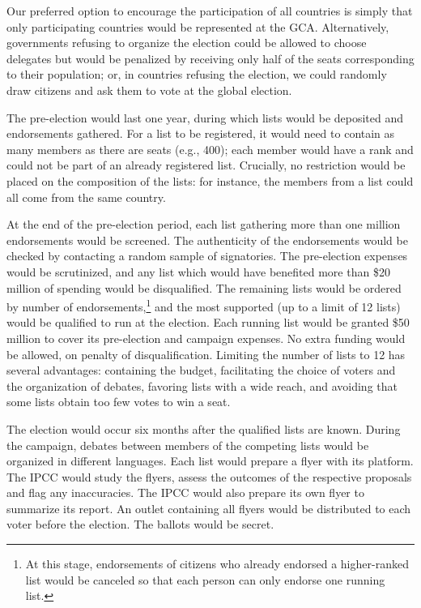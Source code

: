 \documentclass[12pt,english]{article}
\begin{document}
Our preferred option to encourage the participation of all countries is simply that only participating countries would be represented at the GCA. Alternatively,  governments refusing to organize the election could be allowed to choose delegates but would be penalized by receiving only half of the seats corresponding to their population; or, in countries refusing the election, we could randomly draw citizens and ask them to vote at the global election. 

The pre-election would last one year, during which lists would be deposited and endorsements gathered. For a list to be registered, it would need to contain as many members as there are seats (e.g., 400); each member would have a rank and could not be part of an already registered list. Crucially, no restriction would be placed on the composition of the lists: for instance, the members from a list could all come from the same country. %

At the end of the pre-election period, each list gathering more than one million endorsements would be screened. The authenticity of the endorsements would be checked by contacting a random sample of signatories. The pre-election expenses would be scrutinized, and any list which would have benefited more than \$20 million of spending would be disqualified. The remaining lists would be ordered by number of endorsements,\footnote{At this stage, endorsements of citizens who already endorsed a higher-ranked list would be canceled so that each person can only endorse one running list.
} and the most supported (up to a limit of 12 lists) would be qualified to run at the election. Each running list would be granted \$50 million to cover its pre-election and campaign expenses. No extra funding would be allowed, on penalty of disqualification. Limiting the number of lists to 12 has several advantages: containing the budget, facilitating the choice of voters and the organization of debates, favoring lists with a wide reach, and avoiding that some lists obtain too few votes to win a seat. 

The election would occur six months after the qualified lists are known. During the campaign, debates between members of the competing lists would be organized in different languages. Each list would prepare a flyer with its platform. The IPCC would study the flyers, assess the outcomes of the respective proposals and flag any inaccuracies. The IPCC would also prepare its own flyer to summarize its report. An outlet containing all flyers would be distributed to each voter before the election. The ballots would be secret. 
\end{document}

